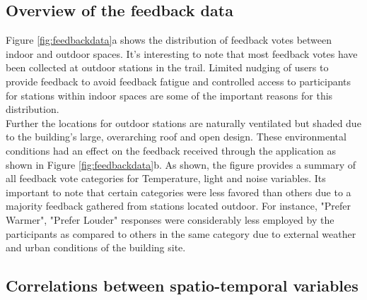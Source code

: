 


\subsection{Overview of the feedback data}

Figure \ref{fig:feedbackdata}a shows the distribution of feedback votes between indoor and outdoor spaces. It's interesting to note that most feedback votes have been collected at outdoor stations in the trail. Limited nudging of users to provide feedback to avoid feedback fatigue \cite{EffectsFeedbackFatigue} and controlled access to participants for stations within indoor spaces are some of the important reasons for this distribution.\\


Further the locations for outdoor stations are naturally ventilated but shaded due to the building's large, overarching roof and open design. These environmental conditions had an effect on the feedback received through the application as shown in Figure \ref{fig:feedbackdata}b.  As shown, the figure provides a summary of all feedback vote categories for Temperature, light and noise variables. Its important to note that certain categories were less favored than others due to a majority feedback gathered from stations located outdoor. For instance, "Prefer Warmer", "Prefer Louder" responses were considerably less employed by the participants as compared to others in the same category due to external weather and urban conditions of the building site.\\    




\subsection{Correlations between spatio-temporal variables}


